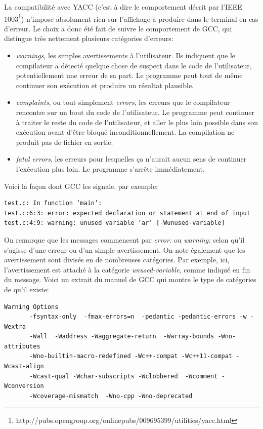 \documentclass[a4paper,11pt,twoside,final]{article}
\begin{document}
  La compatibilité avec YACC (c'est à dire le comportement décrit par l'IEEE
  1003\footnote{%
  http://pubs.opengroup.org/onlinepubs/009695399/utilities/yacc.html}) n'impose
  absolument rien sur l'affichage à produire dans le terminal en cas d'erreur.
  Le choix a donc été fait de suivre le comportement de GCC, qui distingue très
  nettement plusieurs catégories d'erreurs:

  \begin{itemize}
    \item \textit{warnings}, les simples avertissements à l'utilisateur. Ils
      indiquent que le compilateur a détecté quelque chose de suspect dans le
      code de l'utilisateur, potentiellement une erreur de sa part. Le
      programme peut tout de même continuer son exécution et produire un
      résultat plausible.
    \item \textit{complaints}, ou tout simplement \textit{errors}, les erreurs
      que le compilateur rencontre sur un bout du code de l'utilisateur. Le
      programme peut continuer à traiter le reste du code de l'utilisateur,
      et aller le plus loin possible dans son exécution avant d'être bloqué
      inconditionnellement. La compilation ne produit pas de fichier en sortie.
    \item \textit{fatal errors}, les erreurs pour lesquelles ça n'aurait aucun
      sens de continuer l'exécution plus loin. Le programme s'arrête
      immédiatement.
  \end{itemize}

  \vspace{0.5cm}

  Voici la façon dont GCC les signale, par exemple:

  \begin{verbatim}
test.c: In function ‘main’:
test.c:6:3: error: expected declaration or statement at end of input
test.c:4:9: warning: unused variable ‘ar’ [-Wunused-variable]
  \end{verbatim}

  On remarque que les messages commencent par \textit{error:} ou
  \textit{warning:} selon
  qu'il s'agisse d'une erreur ou d'un simple avertissement. On note également
  que les avertissement sont divisés en de nombreuses catégories. Par exemple,
  ici, l'avertissement est attaché à la catégorie \textit{unused-variable},
  comme indiqué en fin du message.
  Voici un extrait du manuel de GCC qui montre le type de catégories de qu'il
  existe:

  \begin{verbatim}
Warning Options
       -fsyntax-only  -fmax-errors=n  -pedantic -pedantic-errors -w -Wextra
       -Wall  -Waddress -Waggregate-return  -Warray-bounds -Wno-attributes
       -Wno-builtin-macro-redefined -Wc++-compat -Wc++11-compat -Wcast-align
       -Wcast-qual -Wchar-subscripts -Wclobbered  -Wcomment -Wconversion
       -Wcoverage-mismatch  -Wno-cpp -Wno-deprecated
  \end{verbatim}
\end{document}
